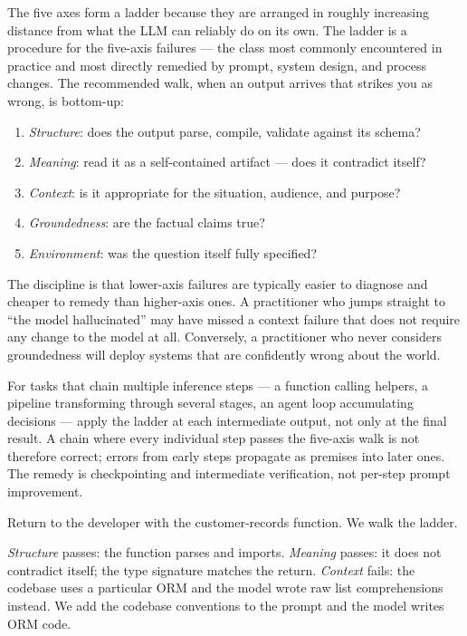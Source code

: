 \documentclass[11pt,a4paper]{article}
\begin{document}
The five axes form a ladder because they are arranged in roughly
increasing distance from what the LLM can reliably do on its own.
The ladder is a procedure for the five-axis failures --- the class
most commonly encountered in practice and most directly remedied
by prompt, system design, and process changes. The recommended
walk, when an output arrives that strikes you as wrong, is
bottom-up:
\begin{enumerate}
  \item \emph{Structure}: does the output parse, compile, validate
        against its schema?
  \item \emph{Meaning}: read it as a self-contained artifact ---
        does it contradict itself?
  \item \emph{Context}: is it appropriate for the situation,
        audience, and purpose?
  \item \emph{Groundedness}: are the factual claims true?
  \item \emph{Environment}: was the question itself fully
        specified?
\end{enumerate}

The discipline is that lower-axis failures are typically easier to
diagnose and cheaper to remedy than higher-axis ones. A
practitioner who jumps straight to ``the model hallucinated'' may
have missed a context failure that does not require any change to
the model at all. Conversely, a practitioner who never considers
groundedness will deploy systems that are confidently wrong about
the world.

For tasks that chain multiple inference steps --- a function
calling helpers, a pipeline transforming through several stages,
an agent loop accumulating decisions --- apply the ladder at each
intermediate output, not only at the final result. A chain where
every individual step passes the five-axis walk is not therefore
correct; errors from early steps propagate as premises into later
ones. The remedy is checkpointing and intermediate verification,
not per-step prompt improvement.

Return to the developer with the customer-records function. We
walk the ladder.

\emph{Structure} passes: the function parses and imports.
\emph{Meaning} passes: it does not contradict itself; the type
signature matches the return. \emph{Context} fails: the codebase
uses a particular ORM and the model wrote raw list comprehensions
instead. We add the codebase conventions to the prompt and the
model writes ORM code.
\end{document}
